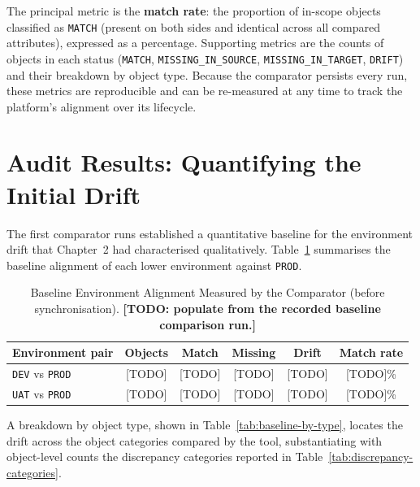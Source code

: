 The principal metric is the \textbf{match rate}: the proportion of in-scope objects classified as \texttt{MATCH} (present on both sides and identical across all compared attributes), expressed as a percentage. Supporting metrics are the counts of objects in each status (\texttt{MATCH}, \texttt{MISSING\_IN\_SOURCE}, \texttt{MISSING\_IN\_TARGET}, \texttt{DRIFT}) and their breakdown by object type. Because the comparator persists every run, these metrics are reproducible and can be re-measured at any time to track the platform's alignment over its lifecycle.

\section{Audit Results: Quantifying the Initial Drift}
\label{sec:results-audit}

The first comparator runs established a quantitative baseline for the environment drift that Chapter~2 had characterised qualitatively. Table~\ref{tab:baseline} summarises the baseline alignment of each lower environment against \texttt{PROD}.

\begin{table}[H]
  \centering
  \begin{tabularx}{\textwidth}{X c c c c c}
    \toprule
    \rowcolor{ibmblue!15}
    \textbf{Environment pair} & \textbf{Objects} & \textbf{Match} & \textbf{Missing} & \textbf{Drift} & \textbf{Match rate} \\
    \midrule
    \texttt{DEV} vs \texttt{PROD} & [TODO] & [TODO] & [TODO] & [TODO] & [TODO]\% \\
    \texttt{UAT} vs \texttt{PROD} & [TODO] & [TODO] & [TODO] & [TODO] & [TODO]\% \\
    \bottomrule
  \end{tabularx}
  \caption{Baseline Environment Alignment Measured by the Comparator (before synchronisation). \textbf{[TODO: populate from the recorded baseline comparison run.]}}
  \label{tab:baseline}
\end{table}

A breakdown by object type, shown in Table~\ref{tab:baseline-by-type}, locates the drift across the object categories compared by the tool, substantiating with object-level counts the discrepancy categories reported in Table~\ref{tab:discrepancy-categories}.

